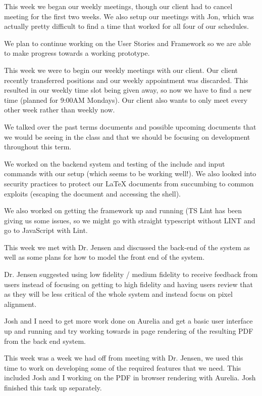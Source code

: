\documentclass[onecolumn, draftclsnofoot,10pt, compsoc]{IEEEtran}
\begin{document}
This week we began our weekly meetings, though our client had to cancel 
meeting for the first two weeks. We also setup our meetings with Jon, which was 
actually pretty difficult to find a time that worked for all four of our schedules.

We plan to continue working on the User Stories and Framework so we are able 
to make progress towards a working prototype.

This week we were to begin our weekly meetings with our client. 
Our client recently transferred positions and our weekly appointment was 
discarded. This resulted in our weekly time slot being given away, so now we 
have to find a new time (planned for 9:00AM Mondays). Our client also wants 
to only meet every other week rather than weekly now.

We talked over the past terms documents and possible upcoming documents that 
we would be seeing in the class and that we should be focusing on development 
throughout this term.

We worked on the backend system and testing of the include and input commands 
with our setup (which seems to be working well!). We also looked into security 
practices to protect our LaTeX documents from succumbing to common exploits 
(escaping the document and accessing the shell).

We also worked on getting the framework up and running (TS Lint has been giving 
us some issues, so we might go with straight typescript without LINT and go to 
JavaScript with Lint.

This week we met with Dr. Jensen and discussed the back-end of the system as 
well as some plans for how to model the front end of the system.

Dr. Jensen suggested using low fidelity / medium fidelity to receive feedback 
from users instead of focusing on getting to high fidelity and having users 
review that as they will be less critical of the whole system and instead 
focus on pixel alignment.

Josh and I need to get more work done on Aurelia and get a basic user interface 
up and running and try working towards in page rendering of the resulting 
PDF from the back end system.


This week was a week we had off from meeting with Dr. Jensen, we used this time 
to work on developing some of the required features that we need. This 
included Josh and I working on the PDF in browser rendering with Aurelia. 
Josh finished this task up separately.
\end{document}
